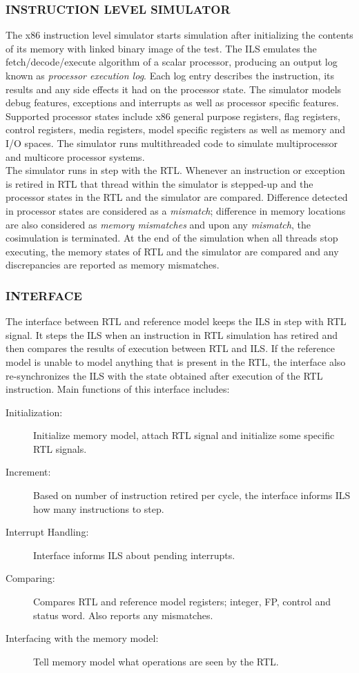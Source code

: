\subsubsection {INSTRUCTION LEVEL SIMULATOR}
The x86 instruction level simulator starts simulation after initializing the contents of its memory with linked binary image of the test. The ILS emulates the fetch/decode/execute algorithm of a scalar processor, producing an output log known as {\it processor execution log}. Each log entry describes the instruction, its results and any side effects it had on the processor state. The simulator models debug features, exceptions and interrupts as well as processor specific features. Supported processor states include x86 general purpose registers, flag registers, control registers, media registers, model specific registers as well as memory and I/O spaces. The simulator runs multithreaded code to simulate multiprocessor and multicore processor systems.\\ 
The simulator runs in step with the RTL. Whenever an instruction or exception is retired in RTL that thread within the simulator is stepped-up and the processor states in the RTL and the simulator are compared. Difference detected in processor states are considered as a {\it mismatch}; difference in memory locations are also considered as {\it memory mismatches} and upon any {\it mismatch}, the cosimulation is terminated. At the end of the simulation when all threads stop executing, the memory states of RTL and the simulator are compared and any discrepancies are reported as memory mismatches.

\subsubsection {INTERFACE}
The interface between RTL and reference model keeps the ILS in step with RTL signal. It steps the ILS when an instruction in RTL simulation has retired and then compares the results of execution between RTL and ILS. If the reference model is unable to model anything that is present in the RTL, the interface also re-synchronizes the ILS with the state obtained after execution of the RTL instruction.
Main functions of this interface includes:
\begin{description}
	\item[Initialization:] Initialize memory model, attach RTL signal and initialize some specific RTL signals.
	\item[Increment:] Based on number of instruction retired per cycle, the interface informs ILS how many instructions to step.
	\item[Interrupt Handling:] Interface informs ILS about pending interrupts.
	\item[Comparing:] Compares RTL and reference model registers; integer, FP, control and status word. Also reports any mismatches.
	\item[Interfacing with the memory model:] Tell memory model what operations are seen by the RTL. 
\end{description}

